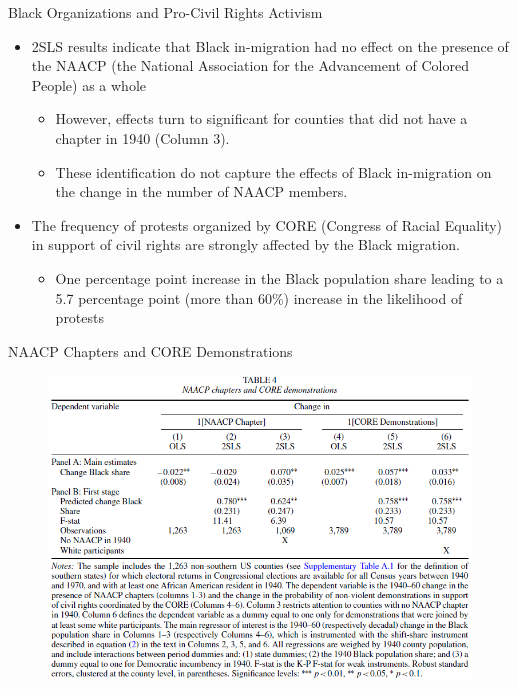 \documentclass[dvipdfmx,11pt]{beamer}
\begin{document}
\begin{frame}{Black Organizations and Pro-Civil Rights Activism}
  \begin{itemize}
    \item 2SLS results indicate that Black in-migration had no effect on the presence of the NAACP (the National Association for the Advancement of Colored People) as a whole
    \begin{itemize}
      \item However, effects turn to significant for counties that did not have a chapter in 1940 (Column 3).
      \item These identification do not capture the effects of Black in-migration on the change in the number of NAACP members.
    \end{itemize}
    \item The frequency of protests organized by CORE (Congress of Racial Equality) in support of civil rights are strongly affected by the Black migration.
    \begin{itemize}
      \item One percentage point increase in the Black population share leading to a 5.7 percentage point (more than 60\%) increase in the likelihood of protests
    \end{itemize}
  \end{itemize}
\end{frame}

\begin{frame}{NAACP Chapters and CORE Demonstrations}
  \begin{figure}
    \centering
    \includegraphics[scale = .5]{fig_tab/os20220708/T4.png}
  \end{figure}
\end{frame}
\end{document}
